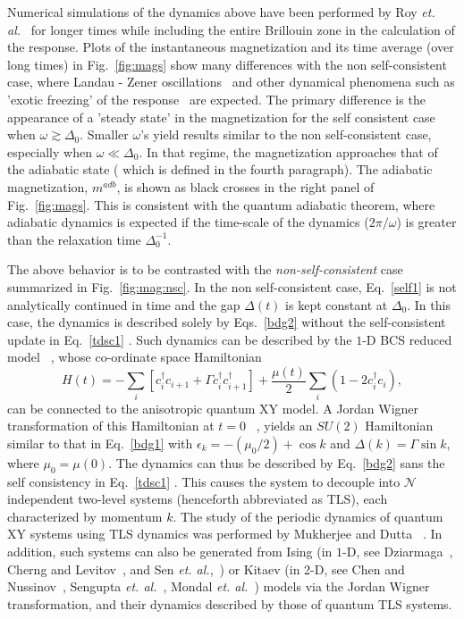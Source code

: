 \documentclass[aps,pra,floats,epsfig,pdflatex]{revtex4}                                                              %
\begin{document}
Numerical simulations of the dynamics above have been performed by Roy \textit{et. al.}~\cite{ourpaper} for longer times while including the entire Brillouin zone in the calculation of the response. Plots of the instantaneous magnetization and its time average (over long times) in Fig.~\ref{fig:mags} show many differences with the non self-consistent case, where Landau - Zener oscillations~\cite{review:lzstls} and other dynamical phenomena such as 'exotic freezing' of the response~\cite{arnab1} are expected. The primary difference is the appearance of a 'steady state' in the magnetization for the self consistent case when $\omega\gtrsim\Delta_0$. Smaller $\omega$'s yield results similar to the non self-consistent case, especially when $\omega\ll\Delta_0$. In that regime, the magnetization approaches that of the adiabatic state ( which is defined in the fourth paragraph). The adiabatic magnetization, $m^{adb}$, is shown as black crosses in the right panel of Fig.~\ref{fig:mags}. This is consistent with the 
quantum adiabatic theorem, where adiabatic dynamics is expected if the 
time-scale of the dynamics ($2\pi/\omega$) is greater than the relaxation time $\Delta^{-1}_0$. 

The above behavior is to be contrasted with the {\it non-self-consistent} case summarized in Fig.~\ref{fig:mag:nsc}.  {In the non self-consistent case, Eq.}~\ref{self1}  {is not analytically continued in time and the gap $\Delta(t)$ is kept constant at $\Delta_0$. In this case, the dynamics is described solely by Eqs.}~\ref{bdg2}  {without the self-consistent update in Eq.}~\ref{tdsc1} {. Such dynamics can be described by the $1$-D BCS reduced model}~\cite{agarg} {, whose co-ordinate space Hamiltonian}
\begin{equation}
H(t)=-\sum_i \left[c^\dagger_ic_{i+1} + \Gamma c^\dagger_ic^\dagger_{i+1}\right]+\frac{\mu(t)}{2} \sum_i \left(1-2 c^\dagger_ic_i\right),
\end{equation}
 { can be connected to the anisotropic quantum XY model. A Jordan Wigner transformation of this Hamiltonian at $t=0$}~\cite{katsura} {, yields an $SU(2)$ Hamiltonian similar to that in Eq.}~\ref{bdg1} { with $\epsilon_k=-(\mu_0/2)+\cos{k}$ and $\Delta(k)=\Gamma\sin{k}$, where $\mu_0=\mu(0)$. The dynamics can thus be described by Eq.}~\ref{bdg2}  { sans the self consistency in Eq.}~\ref{tdsc1} {. This causes the system to decouple into $\mathcal{N}$ independent two-level systems (henceforth abbreviated as TLS), each characterized by momentum $k$. The study of the periodic dynamics of quantum XY systems using TLS dynamics was performed by Mukherjee and Dutta~\cite{xyseminal} . In addition, such systems can also be generated from Ising} (in $1$-D, see  
Dziarmaga~\cite{dziarmaga}, Cherng and Levitov~\cite{cherng:levitov}, and Sen \textit{et. al.},~\cite{dsen})  {or Kitaev} (in 2-D, see Chen and Nussinov~\cite{kitaev2d}, Sengupta \textit{et. al.}~\cite{kitaev2d:krishda}, Mondal \textit{et. al.}~\cite{sreyoshi})   {models via the Jordan Wigner transformation, and their dynamics described by those of quantum TLS systems.}
\end{document}
